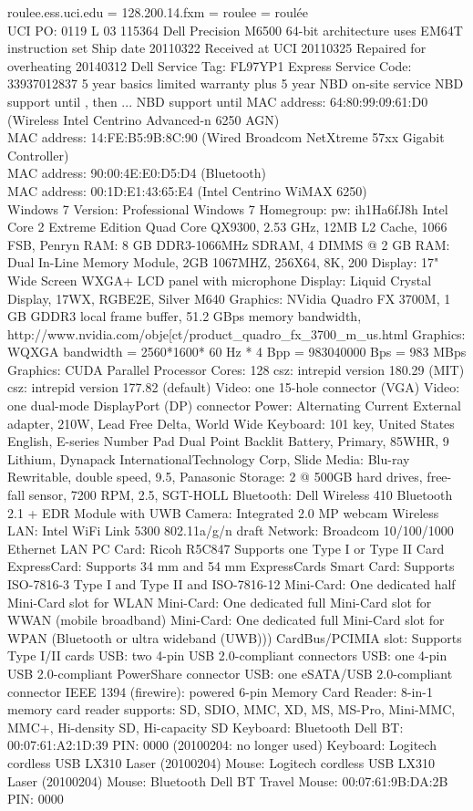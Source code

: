 \documentclass[12pt,twoside]{article}
\begin{document}
roulee.ess.uci.edu = 128.200.14.fxm = roulee = roulée \\
UCI PO: 0119 L 03 115364
Dell Precision M6500
64-bit architecture uses EM64T instruction set
Ship date 20110322
Received at UCI 20110325
Repaired for overheating 20140312
Dell Service Tag: FL97YP1
Express Service Code: 33937012837
5 year basics limited warranty plus 5 year NBD on-site service
NBD support until , then ...
NBD support until 
MAC address: 64:80:99:09:61:D0 (Wireless Intel Centrino Advanced-n 6250 AGN) \\
MAC address: 14:FE:B5:9B:8C:90 (Wired Broadcom NetXtreme 57xx Gigabit Controller) \\
MAC address: 90:00:4E:E0:D5:D4 (Bluetooth) \\
MAC address: 00:1D:E1:43:65:E4 (Intel Centrino WiMAX 6250) \\
Windows 7 Version: Professional
Windows 7 Homegroup: pw: ih1Ha6fJ8h
Intel Core 2 Extreme Edition Quad Core QX9300, 2.53 GHz, 12MB L2 Cache, 1066 FSB, Penryn
RAM: 8 GB DDR3-1066MHz SDRAM, 4 DIMMS @ 2 GB
RAM: Dual In-Line Memory Module, 2GB 1067MHZ, 256X64, 8K, 200
Display: 17" Wide Screen WXGA+ LCD panel with microphone
Display: Liquid Crystal Display, 17WX, RGBE2E, Silver M640
Graphics: NVidia Quadro FX 3700M, 1 GB GDDR3 local frame buffer, 51.2 GBps memory bandwidth, http://www.nvidia.com/obje[ct/product\_quadro\_fx\_3700\_m\_us.html
Graphics: WQXGA bandwidth = 2560*1600* 60 Hz * 4 Bpp = 983040000 Bps = 983 MBps
Graphics: CUDA Parallel Processor Cores: 128
csz: intrepid version 180.29 (MIT)
csz: intrepid version 177.82 (default)
Video: one 15-hole connector (VGA)
Video: one dual-mode DisplayPort (DP) connector 
Power: Alternating Current External adapter, 210W, Lead Free Delta, World Wide
Keyboard: 101 key, United States English, E-series Number Pad Dual Point Backlit
Battery, Primary, 85WHR, 9 Lithium, Dynapack InternationalTechnology Corp, Slide
Media: Blu-ray Rewritable, double speed, 9.5, Panasonic
Storage: 2 @ 500GB hard drives, free-fall sensor, 7200 RPM, 2.5, SGT-HOLL
Bluetooth: Dell Wireless 410 Bluetooth 2.1 + EDR Module with UWB
Camera: Integrated 2.0 MP webcam
Wireless LAN: Intel WiFi Link 5300 802.11a/g/n draft
Network: Broadcom 10/100/1000 Ethernet LAN
PC Card: Ricoh R5C847 Supports one Type I or Type II Card
ExpressCard: Supports 34 mm and 54 mm ExpressCards
Smart Card: Supports ISO-7816-3 Type I and Type II and ISO-7816-12
Mini-Card: One dedicated half Mini-Card slot for WLAN
Mini-Card: One dedicated full Mini-Card slot for WWAN (mobile broadband)
Mini-Card: One dedicated full Mini-Card slot for WPAN (Bluetooth or ultra wideband (UWB)))
CardBus/PCIMIA slot: Supports Type I/II cards
USB: two 4-pin USB 2.0-compliant connectors
USB: one 4-pin USB 2.0-compliant PowerShare connector
USB: one eSATA/USB 2.0-compliant connector
IEEE 1394 (firewire): powered 6-pin
Memory Card Reader: 8-in-1 memory card reader supports: 
SD, SDIO, MMC, XD, MS, MS-Pro, Mini-MMC, MMC+, Hi-density SD, Hi-capacity SD
Keyboard: Bluetooth Dell BT: 00:07:61:A2:1D:39 PIN: 0000 (20100204: no longer used)
Keyboard: Logitech cordless USB LX310 Laser (20100204)
Mouse: Logitech cordless USB LX310 Laser (20100204)
Mouse: Bluetooth Dell BT Travel Mouse: 00:07:61:9B:DA:2B PIN: 0000
\end{document}

